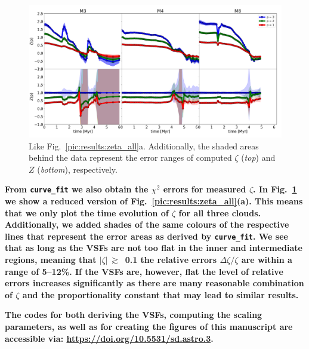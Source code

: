 \begin{figure}
    \centering
    \includegraphics[width=\textwidth]{error_vsf04_zeta_z.pdf}
    \caption{
        Like Fig.~\ref{pic:results:zeta_all}a.
        Additionally, the shaded areas behind the data represent the error ranges of computed $\zeta$ (\textit{top}) and $Z$ (\textit{bottom}), respectively. 
    }
    \label{pic:appFitting:error_vsfhr04_zeta_z}
\end{figure}


\textbf{
    From \texttt{curve\_fit} we also obtain the $\chi^2$ errors for measured $\zeta$. 
    In Fig.~\ref{pic:appFitting:error_vsfhr04_zeta_z} we show a reduced version of Fig.~\ref{pic:results:zeta_all}(a).
    This means that we only plot the time evolution of $\zeta$ for all three clouds.
    Additionally, we added shades of the same colours of the respective lines that represent the error areas as derived by \texttt{curve\_fit}.
    We see that as long as the VSFs are not too flat in the inner and intermediate regions, meaning that $|\zeta|\,\gtrsim$~0.1 the relative errors $\Delta \zeta / \zeta$ are within a range of 5--12\%. 
    If the VSFs are, however, flat the level of relative errors increases significantly as there are many reasonable combination of $\zeta$ and the proportionality constant that may lead to similar results. 
}



\textbf{
    The codes for both deriving the VSFs, computing the scaling parameters, as well as for creating the figures of this manuscript are accessible via: \newline
    {\url{https://doi.org/10.5531/sd.astro.3}}.
}


\endinput
